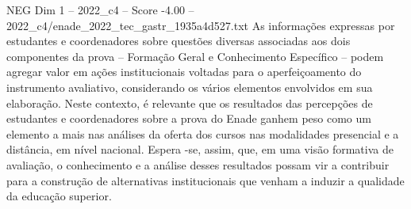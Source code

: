 \begin{textsample}{NEG Dim 1 – 2022\_c4 – Score -4.00 – 2022\_c4/enade\_2022\_tec\_gastr\_1935a4d527.txt}
As informações expressas por estudantes e coordenadores sobre questões diversas associadas aos dois componentes da prova – Formação Geral e Conhecimento Específico – podem agregar valor em ações institucionais voltadas para o aperfeiçoamento do instrumento avaliativo, considerando os vários elementos envolvidos em sua elaboração.
Neste contexto, é relevante que os resultados das percepções de estudantes e coordenadores sobre a prova do Enade ganhem peso como um elemento a mais nas análises da oferta dos cursos nas modalidades presencial e a distância, em nível nacional.
Espera -se, assim, que, em uma visão formativa de avaliação, o conhecimento e a análise desses resultados possam vir a contribuir para a construção de alternativas institucionais que venham a induzir a qualidade da educação superior.

\end{textsample}
